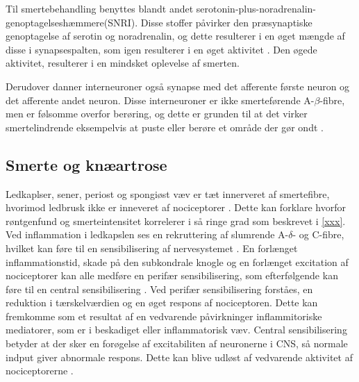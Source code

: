 Til smertebehandling benyttes blandt andet serotonin-plus-noradrenalin-genoptagelseshæmmere(SNRI). Disse stoffer påvirker den præsynaptiske genoptagelse af serotin og noradrenalin, og dette resulterer i en øget mængde af disse i synapsespalten, som igen resulterer i en øget aktivitet \citep{smerter}. Den øgede aktivitet, resulterer i en mindsket oplevelse af smerten. 

Derudover danner interneuroner også synapse med det afferente første neuron og det afferente andet neuron. Disse interneuroner er ikke smerteførende A-$\beta$-fibre, men er følsomme overfor berøring, og dette er grunden til at det virker smertelindrende eksempelvis at puste eller berøre et område der gør ondt \citep{cindys268}.

\subsection{Smerte og knæartrose}
Ledkaplser, sener, periost og spongiøst væv er tæt innerveret af smertefibre, hvorimod ledbrusk ikke er inneveret af nociceptorer \citep{smerter}. Dette kan forklare hvorfor  røntgenfund og smerteintensitet korrelerer i så ringe grad som beskrevet i \ref{xxx}. \citep{Petersen2016}  \citep{smerter}
Ved inflammation i ledkapslen ses en rekruttering af slumrende A-$\delta$- og C-fibre, hvilket kan føre til en sensibilisering af nervesystemet \citep{smerter}. En forlænget inflammationstid, skade på den subkondrale knogle og en forlænget excitation af nociceptorer kan alle medføre en perifær sensibilisering, som efterfølgende kan føre til en central sensibilisering \citep{Petersen2016} .
Ved perifær sensibilisering forståes, en reduktion i tærskelværdien og en øget respons af nociceptoren. Dette kan fremkomme som et resultat af en vedvarende påvirkninger inflammitoriske mediatorer, som er i beskadiget eller inflammatorisk væv. 
Central sensibilisering betyder at der sker en forøgelse af excitabiliten af neuronerne i CNS, så normale indput giver abnormale respons. Dette kan blive udløst af vedvarende aktivitet af nociceptorerne \citep{nature}.\\


